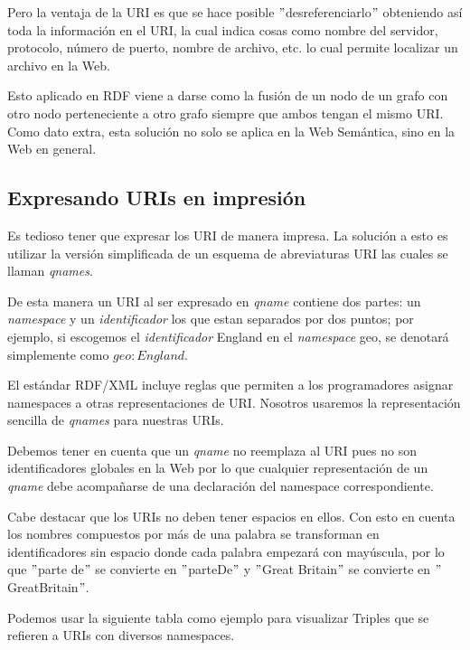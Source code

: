 \documentclass[conference]{IEEEtran}
\begin{document}
Pero la ventaja de la URI es que se hace posible $"$desreferenciarlo$"$ obteniendo así toda la información en el URI, la cual indica cosas como nombre del servidor, protocolo, número de puerto, nombre de archivo, etc.
 lo cual permite localizar un archivo en la Web.
 
 Esto aplicado en RDF viene a darse como la fusión de un nodo de un grafo con otro nodo perteneciente a otro grafo siempre que ambos tengan el mismo URI.
 Como dato extra, esta solución no solo se aplica en la Web Semántica, sino en la Web en general.

\subsection{Expresando URIs en impresión}

Es tedioso tener que expresar los URI de manera impresa. La solución a esto es utilizar la versión simplificada de un esquema de abreviaturas URI las cuales se llaman \textit{qnames}.

De esta manera un URI al ser expresado en \textit{qname} contiene dos partes: un \textit{namespace} y un \textit{identificador} los que estan separados por dos puntos; por ejemplo, si escogemos el \textit{identificador} England en el \textit{namespace} geo, se denotará simplemente como  $geo:England$.

El estándar RDF/XML incluye reglas que permiten a los programadores asignar namespaces a otras representaciones de URI.
Nosotros usaremos la representación sencilla de \textit{qnames} para nuestras URIs.

Debemos tener en cuenta que un \textit{qname} no reemplaza al URI pues no son identificadores globales en la Web por lo que cualquier representación de un \textit{qname} debe acompañarse de una declaración del namespace correspondiente.

Cabe destacar que los URIs no deben tener espacios en ellos. Con esto en cuenta los nombres compuestos por más de una palabra se transforman en identificadores sin espacio donde cada palabra empezará con mayúscula, por lo que $"$parte de$"$ se convierte en $"$parteDe$"$ y $"$Great Britain$"$ se convierte en $"$GreatBritain$"$.

Podemos usar la siguiente tabla como ejemplo para visualizar Triples que se refieren a URIs con diversos namespaces.
\end{document}
